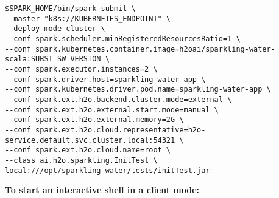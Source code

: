 \begin{lstlisting}[style=Bash]
$SPARK_HOME/bin/spark-submit \
--master "k8s://KUBERNETES_ENDPOINT" \
--deploy-mode cluster \
--conf spark.scheduler.minRegisteredResourcesRatio=1 \
--conf spark.kubernetes.container.image=h2oai/sparkling-water-scala:SUBST_SW_VERSION \
--conf spark.executor.instances=2 \
--conf spark.driver.host=sparkling-water-app \
--conf spark.kubernetes.driver.pod.name=sparkling-water-app \
--conf spark.ext.h2o.backend.cluster.mode=external \
--conf spark.ext.h2o.external.start.mode=manual \
--conf spark.ext.h2o.external.memory=2G \
--conf spark.ext.h2o.cloud.representative=h2o-service.default.svc.cluster.local:54321 \
--conf spark.ext.h2o.cloud.name=root \
--class ai.h2o.sparkling.InitTest \
local:///opt/sparkling-water/tests/initTest.jar
\end{lstlisting}

\textbf{To start an interactive shell in a client mode:}

